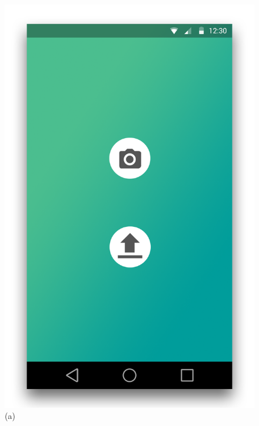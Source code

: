 \documentclass[11pt, a4paper]{report}
\begin{document}
\begin{figure}[h]
\centering
\begin{minipage}[b]{0.2\linewidth}
	\centering
	\includegraphics[totalheight=6cm]{img/03.png}
	(a)
\end{minipage}
\begin{minipage}[b]{0.2\linewidth}
	\centering

\end{minipage}
\end{figure}
\end{document}
